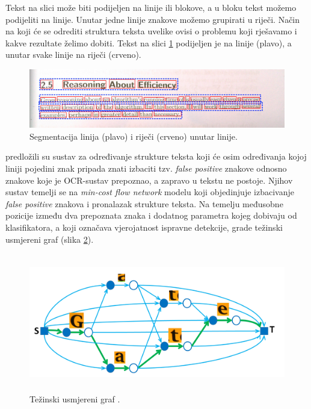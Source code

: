 \documentclass[times, utf8, zavrsni]{fer}
\begin{document}
Tekst na slici može biti podijeljen na linije ili blokove, a u bloku tekst
možemo podijeliti na linije. Unutar jedne linije znakove možemo grupirati u
riječi. Način na koji će se odrediti struktura teksta uvelike ovisi o problemu
koji rješavamo i kakve rezultate želimo dobiti. Tekst na slici
\ref{fig:text-segmentation-01} podijeljen je na linije (plavo), a unutar svake
linije na riječi (crveno).

\begin{figure}[htb]
    \centering
    \includegraphics[width=\textwidth]{images/text-segmentation-01.jpg}
    \caption{Segmentacija linija (plavo) i riječi (crveno) unutar linije.}
    \label{fig:text-segmentation-01}
\end{figure}

\citep{DBLP:journals/corr/TianPHLYT16} predložili su sustav za određivanje
strukture teksta koji će osim određivanja kojoj liniji pojedini znak pripada
znati izbaciti tzv. \emph{false positive} znakove odnosno znakove koje je
OCR-sustav prepoznao, a zapravo u tekstu ne postoje. Njihov sustav temelji
se na \emph{min-cost flow network} modelu koji objedinjuje izbacivanje
\emph{false positive} znakova i pronalazak strukture teksta. Na temelju
međusobne pozicije između dva prepoznata znaka i dodatnog parametra kojeg
dobivaju od klasifikatora, a koji označava vjerojatnost ispravne detekcije,
grade težinski usmjereni graf (slika \ref{fig:text-flow}).

\begin{figure}[htb]
    \centering
    \captionsetup{justification=centering}
    \includegraphics[height=6cm]{images/text-flow.png}
    \caption{Težinski usmjereni graf \citep{DBLP:journals/corr/TianPHLYT16}.}
    \label{fig:text-flow}
\end{figure}
\end{document}

